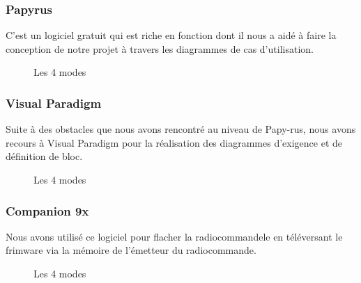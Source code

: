 \documentclass[a4paper,12pt]{book}
\begin{document}
\subsubsection{Papyrus}
C'est un logiciel gratuit qui est riche en fonction dont il nous a aidé à faire la conception de notre projet à travers les diagrammes de cas d'utilisation.
\begin{figure}[h]
	\begin{center}
		\centering
	\end{center}
	\caption{Les 4 modes}
\end{figure}
\newpage
\subsubsection{Visual Paradigm}
Suite à des obstacles que nous avons rencontré au niveau de Papy-rus, nous avons recours à Visual Paradigm pour la réalisation des diagrammes d'exigence et de définition de bloc.
\begin{figure}[h]
	\begin{center}
		\centering
	\end{center}
	\caption{Les 4 modes}
\end{figure}
\subsubsection{Companion 9x}
Nous avons utilisé ce logiciel pour flacher la radiocommandele en téléversant le frimware via la mémoire de l'émetteur du radiocommande.
\begin{figure}[h]
	\begin{center}
		\centering
	\end{center}
	\caption{Les 4 modes}
\end{figure}
\newpage
\end{document}
